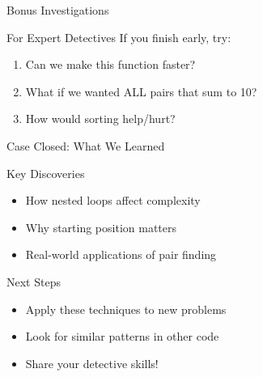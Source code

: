 \documentclass{beamer}
\begin{document}
\begin{frame}{Bonus Investigations}
    \begin{block}{For Expert Detectives}
        If you finish early, try:
        \begin{enumerate}
            \item Can we make this function faster?
            \item What if we wanted ALL pairs that sum to 10?
            \item How would sorting help/hurt?
        \end{enumerate}
    \end{block}
    
    
\end{frame}

\begin{frame}{Case Closed: What We Learned}
    \begin{block}{Key Discoveries}
        \begin{itemize}
            \item How nested loops affect complexity
            \item Why starting position matters
            \item Real-world applications of pair finding
        \end{itemize}
    \end{block}
    
    \begin{alertblock}{Next Steps}
        \begin{itemize}
            \item Apply these techniques to new problems
            \item Look for similar patterns in other code
            \item Share your detective skills!
        \end{itemize}
    \end{alertblock}
\end{frame}
\end{document}
